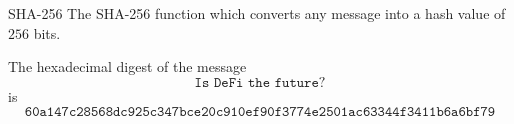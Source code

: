 \documentclass{beamer}
\begin{document}
\begin{frame}{SHA-256}
The SHA-256 function which converts any message into a hash value of $256$ bits.
\begin{tcolorbox}[enhanced,drop shadow, title=Example]
The hexadecimal digest of the message
$$
\texttt{Is DeFi the future?}
$$
is 
\footnotesize
$$
\texttt{60a147c28568dc925c347bce20c910ef90f3774e2501ac63344f3411b6a6bf79}
$$
\end{tcolorbox}
\end{frame}
\end{document}
